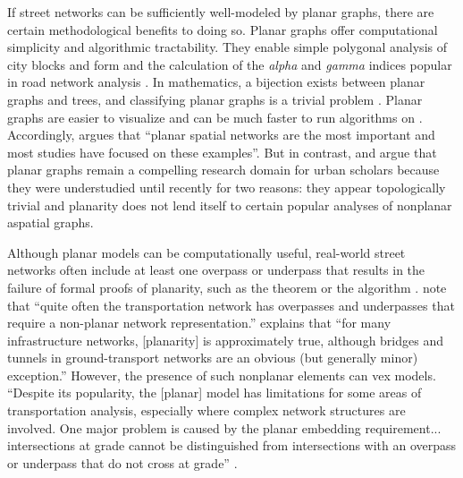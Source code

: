 \documentclass[Afour,sageh,times]{sagej}
\begin{document}
If street networks can be sufficiently well-modeled by planar graphs, there are certain methodological benefits to doing so. Planar graphs offer computational simplicity and algorithmic tractability. They enable simple polygonal analysis of city blocks and form \citep{fohl_non-planar_1996,barthelemy_paths_2017} and the calculation of the \emph{alpha} and \emph{gamma} indices popular in road network analysis \citep{eppstein_studying_2008}. In mathematics, a bijection exists between planar graphs and trees, and classifying planar graphs is a trivial problem \citep{louf_typology_2014}. Planar graphs are easier to visualize and can be much faster to run algorithms on \citep{liebers_planarizing_2001}. Accordingly, \citet[p.~3]{barthelemy_spatial_2011} argues that \enquote{planar spatial networks are the most important and most studies have focused on these examples}. But in contrast, \citet{masucci_random_2009} and \citet{masucci_limited_2013} argue that planar graphs remain a compelling research domain for urban scholars because they were understudied until recently for two reasons: they appear topologically trivial and planarity does not lend itself to certain popular analyses of nonplanar aspatial graphs.

Although planar models can be computationally useful, real-world street networks often include at least one overpass or underpass that results in the failure of formal proofs of planarity, such as the \citet{kuratowski_sur_1930} theorem or the \cite{hopcroft_efficient_1974} algorithm \citep[cf.][]{gastner_spatial_2006,levinson_network_2012}. \citet[p.~199]{jiang_object-oriented_2010} note that \enquote{quite often the transportation network has overpasses and underpasses that require a non-planar network representation.} \citet[p.~1258]{fischer_spatial_2014} explains that \enquote{for many infrastructure networks, {[planarity]} is approximately true, although bridges and tunnels in ground-transport networks are an obvious (but generally minor) exception.} However, the presence of such nonplanar elements can vex models. \enquote{Despite its popularity, the [planar] model has limitations for some areas of transportation analysis, especially where complex network structures are involved. One major problem is caused by the planar embedding requirement... intersections at grade cannot be distinguished from intersections with an overpass or underpass that do not cross at grade} \citep[p.~395]{fischer_gis_2004}.
\end{document}
